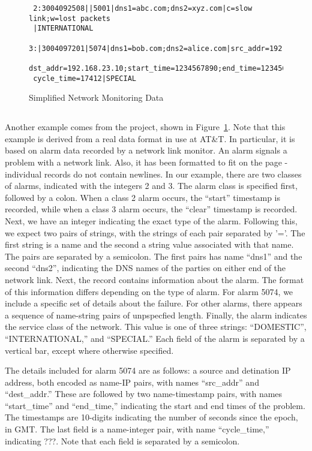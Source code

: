 \begin{figure}
  \centering
  \small
\begin{verbatim}
 2:3004092508||5001|dns1=abc.com;dns2=xyz.com|c=slow link;w=lost packets
 |INTERNATIONAL
 3:|3004097201|5074|dns1=bob.com;dns2=alice.com|src_addr=192.168.0.10;
 dst_addr=192.168.23.10;start_time=1234567890;end_time=1234568000;
 cycle_time=17412|SPECIAL
\end{verbatim}  
  \caption{Simplified Network Monitoring Data}
  \label{fig:darkstar-records}
\end{figure}

\subsection{\darkstar{}}

Another example comes from the \darkstar{} project, shown in
Figure~\ref{fig:darkstar-records}. Note that this example is derived
from a real data format in use at AT\&T. In particular, it is based on
alarm data recorded by a network link monitor. An alarm signals a
problem with a network link. Also, it has been formatted to fit on the
page - individual records do not contain newlines. In our example,
there are two classes of alarms, indicated with the integers 2 and 3.
The alarm class is specified first, followed by a colon. When a class
2 alarm occurs, the ``start'' timestamp is recorded, while when a
class 3 alarm occurs, the ``clear'' timestamp is recorded.  Next, we
have an integer indicating the exact type of the alarm.  Following
this, we expect two pairs of strings, with the strings of each pair
separated by '='. The first string is a name and the second a string
value associated with that name. The pairs are separated by a
semicolon.  The first pairs has name ``dns1'' and the second ``dns2'',
indicating the DNS names of the parties on either end of the network
link. Next, the record contains information about the alarm. The
format of this information differs depending on the type of alarm. For
alarm 5074, we include a specific set of details about the failure.
For other alarms, there appears a sequence of name-string pairs of
unpspecfied length.  Finally, the alarm indicates the service class of
the network. This value is one of three strings: ``DOMESTIC'',
``INTERNATIONAL,'' and ``SPECIAL.'' Each field of the alarm is
separated by a vertical bar, except where otherwise specified.

The details included for alarm 5074 are as follows: a source and
detination IP address, both encoded as name-IP pairs, with names
``src\_addr'' and ``dest\_addr.'' These are followed by two
name-timestamp pairs, with names ``start\_time'' and ``end\_time,''
indicating the start and end times of the problem. The timestamps are
10-digits indicating the number of seconds since the epoch, in
GMT. The last field is a name-integer pair, with name ``cycle\_time,''
indicating ???. Note that each field is separated by a semicolon.

